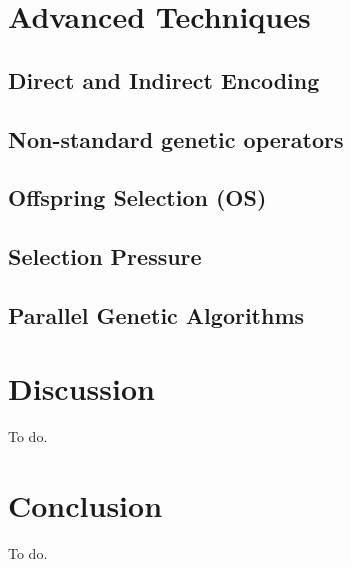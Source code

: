 \documentclass[sigconf]{acmart}
\begin{document}
\section{Advanced Techniques}

\subsection{Direct and Indirect Encoding}

\subsection{Non-standard genetic operators}


\subsection{Offspring Selection (OS)}

\subsection{Selection Pressure}

\subsection{Parallel Genetic Algorithms}


\section{Discussion}
To do.

\section{Conclusion}
To do.

\end{document}
